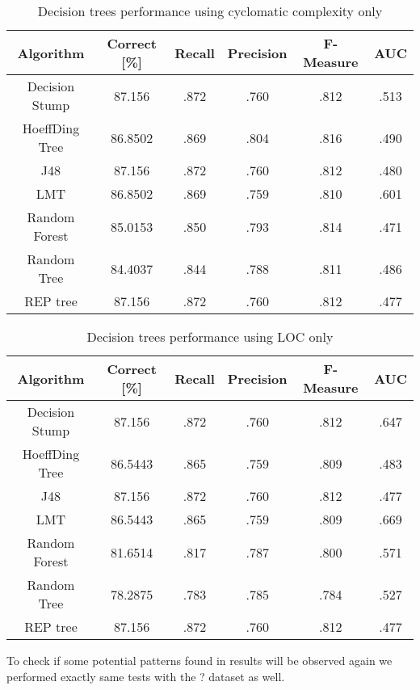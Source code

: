 \begin{table}[h!]
\centering
\begin{tabular}{ |c|c|c|c|c|c| } 
 \hline
 \textbf{Algorithm} & \textbf{Correct [\%]} &  \textbf{Recall} & \textbf{Precision} & \textbf{F-Measure} & \textbf{AUC}  \\ 
 \hline
 Decision Stump & \textcolor{myRed}{87.156} & \textcolor{myRed}{.872} & .760 & .812 & .513    \\ 
 \hline
 HoeffDing Tree & 86.8502 & .869 & \textcolor{myRed}{.804} & \textcolor{myRed}{.816} & .490   \\ 
 \hline
  J48 & \textcolor{myRed}{87.156} & \textcolor{myRed}{.872} & .760 & .812 & .480\\ 
 \hline
  LMT & 86.8502 & .869 & .759 & .810 & \textcolor{myRed}{.601}  \\ 
 \hline
  Random Forest & 85.0153 & .850 & .793 & .814 & .471 \\ 
 \hline
  Random Tree & 84.4037 & .844 & .788 & .811 & .486 \\ 
 \hline
 REP tree  & \textcolor{myRed}{87.156} & \textcolor{myRed}{.872} & .760 & .812 & .477 \\ 
 \hline
\end{tabular}
\caption{Decision trees performance using cyclomatic complexity only}
\label{table:DT_complexity}
\end{table}


\begin{table}[h!]
\centering
\begin{tabular}{ |c|c|c|c|c|c| } 
 \hline
 \textbf{Algorithm} & \textbf{Correct [\%]} &  \textbf{Recall} & \textbf{Precision} & \textbf{F-Measure} & \textbf{AUC}  \\ 
 \hline
 Decision Stump & \textcolor{myRed}{87.156}& \textcolor{myRed}{.872} & .760 & .812 & .647    \\ 
 \hline
 HoeffDing Tree & 86.5443 & .865 & .759 & .809 & .483   \\ 
 \hline
  J48 & \textcolor{myRed}{87.156} & \textcolor{myRed}{.872} & .760 & \textcolor{myRed}{.812} & .477\\ 
 \hline
  LMT & 86.5443 & .865 & .759 & .809 & \textcolor{myRed}{.669}  \\ 
 \hline
  Random Forest & 81.6514 & .817 & \textcolor{myRed}{.787} & .800 & .571 \\ 
 \hline
  Random Tree & 78.2875 & .783 & .785 & .784 & .527 \\ 
 \hline
 REP tree  & \textcolor{myRed}{87.156} & \textcolor{myRed}{.872} & .760 & .812 & .477 \\ 
 \hline

\end{tabular}
\caption{Decision trees performance using LOC only}
\label{table:DT_LOC}
\end{table}

To check if some potential patterns found in results will be observed again we performed exactly same tests with the ? dataset as well.